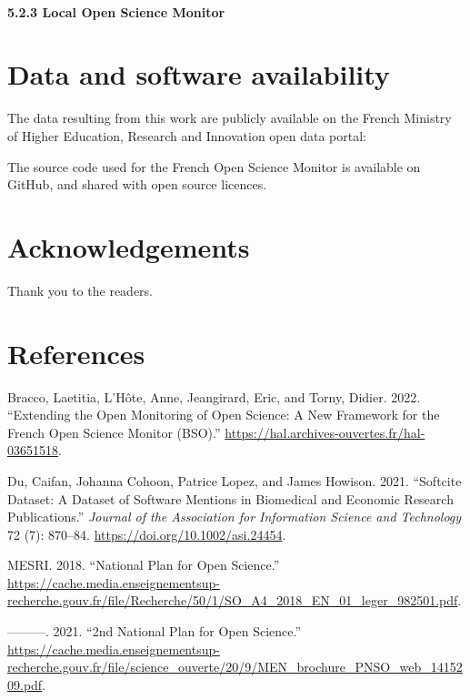 \documentclass[
]{article}
\newlength{\cslhangindent}
\newenvironment{cslreferences}%
  {\setlength{\parindent}{0pt}%
  \everypar{\setlength{\hangindent}{\cslhangindent}}\ignorespaces}%
  {\par}
\begin{document}
\hypertarget{local-open-science-monitor}{%
\paragraph{5.2.3 Local Open Science
Monitor}\label{local-open-science-monitor}}

\hypertarget{data-and-software-availability}{%
\section{Data and software
availability}\label{data-and-software-availability}}

The data resulting from this work are publicly available on the French
Ministry of Higher Education, Research and Innovation open data portal:

The source code used for the French Open Science Monitor is available on
GitHub, and shared with open source licences.

\hypertarget{acknowledgements}{%
\section{Acknowledgements}\label{acknowledgements}}

Thank you to the readers.

\hypertarget{references}{%
\section*{References}\label{references}}

\hypertarget{refs}{}
\begin{cslreferences}
\leavevmode\hypertarget{ref-bracco_extending_2022}{}%
Bracco, Laetitia, L'Hôte, Anne, Jeangirard, Eric, and Torny, Didier.
2022. ``Extending the Open Monitoring of Open Science: A New Framework
for the French Open Science Monitor (BSO).''
\url{https://hal.archives-ouvertes.fr/hal-03651518}.

\leavevmode\hypertarget{ref-du_softcite_2021}{}%
Du, Caifan, Johanna Cohoon, Patrice Lopez, and James Howison. 2021.
``Softcite Dataset: A Dataset of Software Mentions in Biomedical and
Economic Research Publications.'' \emph{Journal of the Association for
Information Science and Technology} 72 (7): 870--84.
\url{https://doi.org/10.1002/asi.24454}.

\leavevmode\hypertarget{ref-mesri_national_2018}{}%
MESRI. 2018. ``National Plan for Open Science.''
\url{https://cache.media.enseignementsup-recherche.gouv.fr/file/Recherche/50/1/SO_A4_2018_EN_01_leger_982501.pdf}.

\leavevmode\hypertarget{ref-mesri_2nd_2021}{}%
---------. 2021. ``2nd National Plan for Open Science.''
\url{https://cache.media.enseignementsup-recherche.gouv.fr/file/science_ouverte/20/9/MEN_brochure_PNSO_web_1415209.pdf}.
\end{cslreferences}
\end{document}
